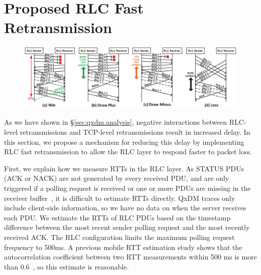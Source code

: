 \section{Proposed RLC Fast\\ Retransmission}\label{sec:eval}

\begin{figure}[th!]
	\centering
	\includegraphics[width=\textwidth]{figs/cost_benefit.eps}
	\vspace{-4ex}
	\label{fig:cost.benefit.detail}
\end{figure}

As we have shown in \S\ref{sec:qxdm.analysis}, negative interactions between RLC-level retransmissions and TCP-level retransmissions result in increased delay. In this section, we propose a mechanism for reducing this delay by implementing RLC fast retransmission to allow the RLC layer to respond faster to packet loss.

First, we explain how we measure RTTs in the RLC layer.  As STATUS PDUs (ACK or NACK) are not generated by every received PDU, and are only triggered if a polling request is received or one or more PDUs are missing in the receiver buffer~\cite{spec-3G-RLC}, it is difficult to estimate RTTs directly.  QxDM traces only include client-side information, so we have no data on when the server receives each PDU.  We estimate the RTTs of RLC PDUs based on the timestamp difference between the most recent sender polling request and the most recently received ACK.  The RLC configuration limits the maximum polling request frequency to 500ms.  A previous mobile RTT estimation study shows that the autocorrelation coefficient between two RTT measurements within 500 ms is more than 0.6~\cite{proteus}, so this estimate is reasonable.

